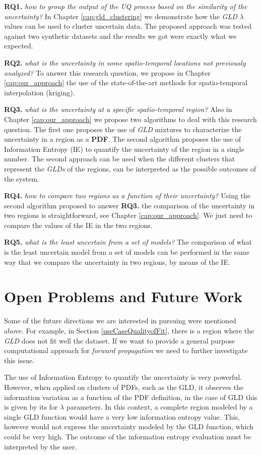 \textbf{RQ1.} \textit{how to group the output of the UQ process based on the similarity of the uncertainty?}
In Chapter \ref{cap:gld_clustering} we demonstrate how the \textit{GLD} $\lambda$ values can be used to cluster uncertain data. The proposed approach was tested against two synthetic datasets and the results we got were exactly what we expected. 

\textbf{RQ2.} \textit{what is the uncertainty in some spatio-temporal locations not previously analyzed?}
To answer this research question, we propose in Chapter \ref{cap:our_approach} the use of the state-of-the-art methods for spatio-temporal interpolation (kriging). 

\textbf{RQ3.} \textit{what is the uncertainty at a specific spatio-temporal region?}
Also in Chapter \ref{cap:our_approach} we propose two algorithms to deal with this research question. The first one proposes the use of \textit{GLD} mixtures to characterize the uncertainty in a region as a \textbf{PDF}. The second algorithm proposes the use of Information Entropy (IE) to quantify the uncertainty of the region in a single number. The second approach can be used when the different clusters that represent the \textit{GLDs} of the regions, can be interpreted as the possible outcomes of the system.

\textbf{RQ4.} \textit{how to compare two regions as a function of their uncertainty?}
Using the second algorithm proposed to answer  \textbf{RQ3.} the comparison of the uncertainty in two regions is straightforward, see Chapter \ref{cap:our_approach}. We just need to compare the values of the IE in the two regions.

\textbf{RQ5.} \textit{what is the least uncertain from a set of models?}
The comparison of what is the least uncertain model from a set of models can be performed in the same way that we compare the uncertainty in two regions, by means of the IE.

\section{Open Problems and Future Work}
Some of the future directions we are interested in pursuing were mentioned above. For example, in Section \ref{useCaseQualityofFit}, there is a region where the \textit{GLD} does not fit well the dataset. If we want to provide a general purpose computational approach for \textit{forward propagation} we need to further investigate this issue.

The use of Information Entropy to quantify the uncertainty is very powerful. However, when applied on clusters of PDFs, such as the GLD, it observes the information variation as a function of the PDF definition, in the case of GLD this is given by its for $\lambda$ parameters. In this context, a complete region modeled by a single GLD function would have a very low information entropy value. This, however would not express the uncertainty modeled by the GLD function, which could be very high. The outcome of the information entropy evaluation must be interpreted by the user. 

